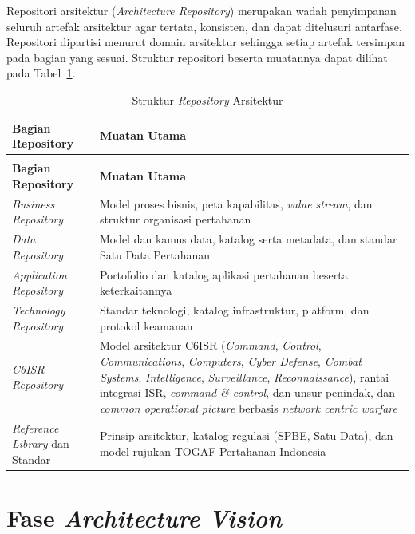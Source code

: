 Repositori arsitektur (\textit{Architecture Repository}) merupakan wadah penyimpanan seluruh artefak arsitektur agar tertata, konsisten, dan dapat ditelusuri antarfase. Repositori dipartisi menurut domain arsitektur sehingga setiap artefak tersimpan pada bagian yang sesuai. Struktur repositori beserta muatannya dapat dilihat pada Tabel~\ref{tab:d4-4}.

\begin{longtable}{@{}>{\raggedright\arraybackslash}p{}>{\raggedright\arraybackslash}p{}@{}}
\caption{Struktur \textit{Repository} Arsitektur}
\label{tab:d4-4}\\
\toprule
\textbf{Bagian Repository} & \textbf{Muatan Utama}\\
\midrule
\endfirsthead
\multicolumn{2}{@{}l}{\small\itshape \tablename\ \thetable{} (lanjutan)}\\
\toprule
\textbf{Bagian Repository} & \textbf{Muatan Utama}\\
\midrule
\endhead
\bottomrule
\endlastfoot
\textit{Business Repository} & Model proses bisnis, peta kapabilitas, \textit{value stream}, dan struktur organisasi pertahanan\\
\textit{Data Repository} & Model dan kamus data, katalog serta metadata, dan standar Satu Data Pertahanan\\
\textit{Application Repository} & Portofolio dan katalog aplikasi pertahanan beserta keterkaitannya\\
\textit{Technology Repository} & Standar teknologi, katalog infrastruktur, platform, dan protokol keamanan\\
\textit{C6ISR Repository} & Model arsitektur C6ISR (\textit{Command}, \textit{Control}, \textit{Communications}, \textit{Computers}, \textit{Cyber Defense}, \textit{Combat Systems}, \textit{Intelligence}, \textit{Surveillance}, \textit{Reconnaissance}), rantai integrasi ISR, \textit{command \& control}, dan unsur penindak, dan \textit{common operational picture} berbasis \textit{network centric warfare}\\
\textit{Reference Library} dan Standar & Prinsip arsitektur, katalog regulasi (SPBE, Satu Data), dan model rujukan TOGAF Pertahanan Indonesia\\
\end{longtable}

\section{Fase \textit{Architecture Vision}}

